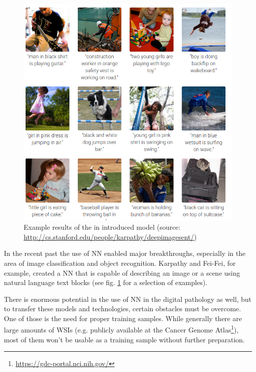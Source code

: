 \begin{figure}[ht]
	\begin{center}
		\includegraphics[scale=0.3]{img/deepVisual.png}
		\caption{Example results of the in \cite{Karpathy15} introduced model (source: \url{http://cs.stanford.edu/people/karpathy/deepimagesent/})}
		\label{fig1_karpathy}
	\end{center}
\end{figure}

In the recent past the use of NN enabled major breakthroughs, especially in the area of image classification and object recognition. Karpathy and Fei-Fei, for example, created a NN that is capable of describing an image or a scene using natural language text blocks \cite{Karpathy15} (see fig. \ref{fig1_karpathy} for a selection of examples).

There is enormous potential in the use of NN in the digital pathology as well, but to transfer these models and technologies, certain obstacles must be overcome. One of those is the need for proper training samples. While generally there are large amounts of WSIs (e.g. publicly available at the Cancer Genome Atlas\footnote{\url{https://gdc-portal.nci.nih.gov/}}), most of them won't be usable as a training sample without further preparation.

